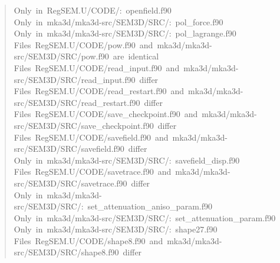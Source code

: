 \documentclass[10pt,a4paper,english]{article}
\begin{document}
\begin{quote}
{Only~in~RegSEM.U/CODE/:~openfield.f90~\\
Only~in~mka3d/mka3d-src/SEM3D/SRC/:~pol{\_}force.f90~\\
Only~in~mka3d/mka3d-src/SEM3D/SRC/:~pol{\_}lagrange.f90~\\
Files~RegSEM.U/CODE/pow.f90~and~mka3d/mka3d-src/SEM3D/SRC/pow.f90~are~identical~\\
Files~RegSEM.U/CODE/read{\_}input.f90~and~mka3d/mka3d-src/SEM3D/SRC/read{\_}input.f90~differ~\\
Files~RegSEM.U/CODE/read{\_}restart.f90~and~mka3d/mka3d-src/SEM3D/SRC/read{\_}restart.f90~differ~\\
Files~RegSEM.U/CODE/save{\_}checkpoint.f90~and~mka3d/mka3d-src/SEM3D/SRC/save{\_}checkpoint.f90~differ~\\
Files~RegSEM.U/CODE/savefield.f90~and~mka3d/mka3d-src/SEM3D/SRC/savefield.f90~differ~\\
Only~in~mka3d/mka3d-src/SEM3D/SRC/:~savefield{\_}disp.f90~\\
Files~RegSEM.U/CODE/savetrace.f90~and~mka3d/mka3d-src/SEM3D/SRC/savetrace.f90~differ~\\
Only~in~mka3d/mka3d-src/SEM3D/SRC/:~set{\_}attenuation{\_}aniso{\_}param.f90~\\
Only~in~mka3d/mka3d-src/SEM3D/SRC/:~set{\_}attenuation{\_}param.f90~\\
Only~in~mka3d/mka3d-src/SEM3D/SRC/:~shape27.f90~\\
Files~RegSEM.U/CODE/shape8.f90~and~mka3d/mka3d-src/SEM3D/SRC/shape8.f90~differ
}\end{quote}
\end{document}

